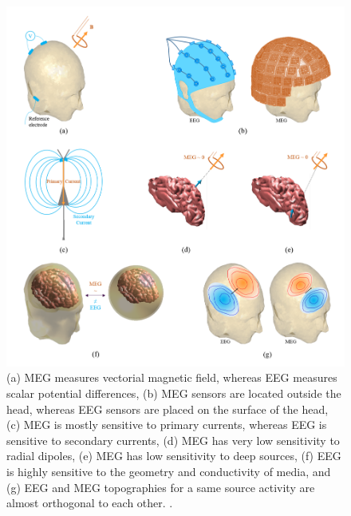 \begin{figure}[!b]
\centering
\includegraphics[width=1\textwidth]{images/Complementarities.png} %
\caption{(a) MEG measures vectorial magnetic field, whereas EEG measures scalar potential differences, (b) MEG sensors are located outside the head, whereas EEG sensors are placed on the surface of the head, (c) MEG is mostly sensitive to primary currents, whereas EEG is sensitive to secondary currents, (d) MEG has very low sensitivity to radial dipoles, (e) MEG has low sensitivity to deep sources, (f) EEG is highly sensitive to the geometry and conductivity of media, and (g) EEG and MEG topographies for a same source activity are almost orthogonal to each other.
.}
\label{fig:Complementarities}
\end{figure}